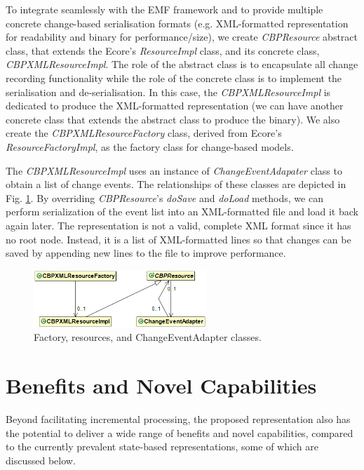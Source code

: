 \documentclass{llncs}
\begin{document}
To integrate seamlessly with the EMF framework and to provide multiple concrete change-based serialisation formats (e.g. XML-formatted representation for readability and binary for performance/size), we create \emph{CBPResource} abstract class, that extends the Ecore's \emph{ResourceImpl} class, and its concrete class, \emph{CBPXMLResourceImpl}. The role of the abstract class is to encapsulate all change recording functionality while the role of the concrete class is to implement the serialisation and de-serialisation. In this case, the \emph{CBPXMLResourceImpl} is dedicated to produce the XML-formatted representation (we can have another concrete class that extends the abstract class to produce the binary). We also create the \emph{CBPXMLResourceFactory} class, derived from Ecore's \emph{ResourceFactoryImpl}, as the factory class for change-based models. 

The \emph{CBPXMLResourceImpl} uses an instance of \emph{ChangeEventAdapater} class to obtain a list of change events. The relationships of these classes are depicted in Fig. \ref{resources}. By overriding \emph{CBPResource}'s \emph{doSave} and  \emph{doLoad} methods, we can perform serialization of the event list into an XML-formatted file and load it back again later. The representation is not a valid, complete XML format since it has no root node. Instead, it is a list of XML-formatted lines so that changes can be saved by appending new lines to the file to improve performance.


\begin{figure}[th]
\centering
\includegraphics[width=6.5cm]{resources}
\caption{Factory, resources, and ChangeEventAdapter classes.}
\label{resources}
\end{figure}

\section{Benefits and Novel Capabilities}
\label{Benefits and Novel Capabilities}
Beyond facilitating incremental processing, the proposed representation also has the potential to deliver a wide range of benefits and novel capabilities, compared to the currently prevalent state-based representations, some of which are discussed below.
\end{document}
